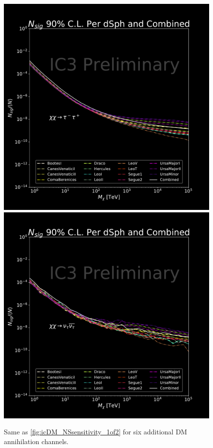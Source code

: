 \begin{figure}[h]
{        \includegraphics[scale=0.265]{figures/ic_DM/dm_plots/tautau_money_plot_comb_ns.pdf}
        \includegraphics[scale=0.265]{figures/ic_DM/dm_plots/nutaunutau_money_plot_comb_ns.pdf}
    }
    \caption{Same as \cref{fig:icDM_NSsensitivity_1of2} for six additional DM annihilation channels.}
    \label{fig:icDM_Nssensitivity_2of2}
\end{figure}